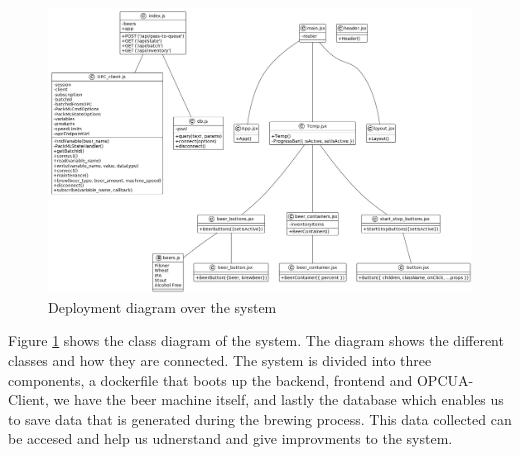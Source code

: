 \begin{center}
    \centering
    \begin{figure}[H]
        \includegraphics[width=1\textwidth]{img/class_diagram.png}
        \caption{Deployment diagram over the system}
        \label{fig:class_diagram}
    \end{figure}
\end{center}
Figure \ref{fig:class_diagram} shows the class diagram of the system. The diagram shows the different classes and how they are connected. The system is divided into three components, a dockerfile that boots up the backend, frontend and OPCUA-Client, we have the beer machine itself, and lastly the database which enables us to save data that is generated during the brewing process. This data collected can be accesed and help us udnerstand and give improvments to the system. \newline